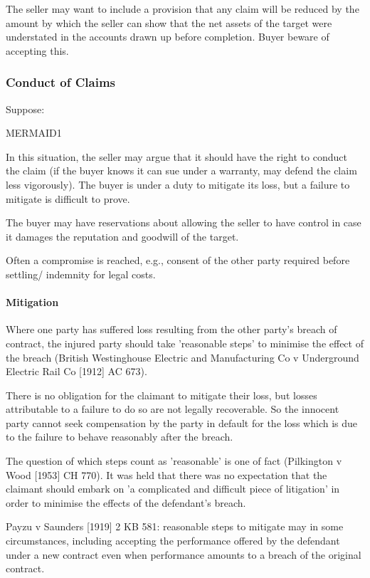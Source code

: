 \documentclass[
]{article}
\begin{document}
The seller may want to include a provision that any claim will be
reduced by the amount by which the seller can show that the net assets
of the target were understated in the accounts drawn up before
completion. Buyer beware of accepting this.

\hypertarget{conduct-of-claims}{%
\subsubsection{Conduct of Claims}\label{conduct-of-claims}}

Suppose:

MERMAID1

In this situation, the seller may argue that it should have the right to
conduct the claim (if the buyer knows it can sue under a warranty, may
defend the claim less vigorously). The buyer is under a duty to mitigate
its loss, but a failure to mitigate is difficult to prove.

The buyer may have reservations about allowing the seller to have
control in case it damages the reputation and goodwill of the target.

Often a compromise is reached, e.g., consent of the other party required
before settling/ indemnity for legal costs.

\hypertarget{mitigation}{%
\paragraph{Mitigation}\label{mitigation}}

Where one party has suffered loss resulting from the other party's
breach of contract, the injured party should take 'reasonable steps' to
minimise the effect of the breach (British Westinghouse Electric and
Manufacturing Co v Underground Electric Rail Co {[}1912{]} AC 673).

There is no obligation for the claimant to mitigate their loss, but
losses attributable to a failure to do so are not legally recoverable.
So the innocent party cannot seek compensation by the party in default
for the loss which is due to the failure to behave reasonably after the
breach.

The question of which steps count as 'reasonable' is one of fact
(Pilkington v Wood {[}1953{]} CH 770). It was held that there was no
expectation that the claimant should embark on 'a complicated and
difficult piece of litigation' in order to minimise the effects of the
defendant's breach.

Payzu v Saunders {[}1919{]} 2 KB 581: reasonable steps to mitigate may
in some circumstances, including accepting the performance offered by
the defendant under a new contract even when performance amounts to a
breach of the original contract.
\end{document}
